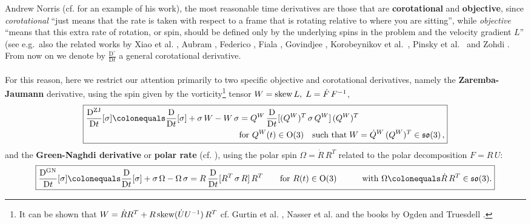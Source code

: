 \documentclass[10pt]{article}
\numberwithin{theoremCounter}{section}
\theoremstyle{plain}
\theoremstyle{definition}
\newcommand{\OO}{{\rm O}}
\newcommand{\DD}{\mathrm{D}}
\DeclareMathOperator{\ZJ}{ZJ}
\DeclareMathOperator{\GN}{GN}
\def\sk{\textnormal{skew}}
\numberwithin{equation}{section}
\begin{document}
Andrew Norris (cf. \cite{Norris2008} for an example of his work), the most reasonable time derivatives are those that are \textbf{corotational} and \textbf{objective}, since \textsl{corotational} \enquote{just means that the rate is taken with respect to a frame that is rotating relative to where you are sitting}, while \textsl{objective} \enquote{means that this extra rate of rotation, or spin, should be defined only by the underlying spins in the problem and the velocity gradient $L$} (see e.g.~also the related works by Xiao et al. \cite{xiao97, xiao98_2}, Aubram \cite{Aubram2017}, Federico \cite{bellini2015, palizi2020consistent}, Fiala \cite{fiala2009, fiala2016, fiala2020objective}, Govindjee \cite{govindjee1997}, Korobeynikov et al.~\cite{korobeynikov2018, korobeynikov2023, korobeynikov2023book, korobeynikov2024}, Pinsky et al.~\cite{pinsky1983} and Zohdi \cite{zohdi2006}. From now on we denote by $\frac{\DD^{\circ}}{\DD t}$ a general corotational derivative. \\
\\
For this reason, here we restrict our attention primarily to two specific objective and corotational derivatives, namely the \textbf{Zaremba-Jaumann} derivative, using the spin given by the vorticity\footnote
{
It can be shown that $W = \dot{R}R^T + R \, \sk(\dot{U}U^{-1}) \, R^T$ cf. Gurtin et al. \cite{Gurtin2010}, Nasser et al. \cite{mehrabadi1987} and the books by Ogden \cite[p.126]{Ogden83} and Truesdell \cite[p.21]{truesdell1966}.
}
tensor $W = \sk \, L, \; L = \dot F \, F^{-1}$,
	\begin{equation}
	\label{ZJrate01}
	\boxed{
		\begin{aligned}
		\frac{\DD^{\ZJ}}{\DD t}[\sigma] \colonequals \frac{\DD}{\DD t}[\sigma] + \sigma \, W - W \, \sigma &= Q^W \, \frac{\DD}{\DD t}[(Q^W)^T \, \sigma \, Q^W] \, (Q^W)^T  \\
		&\textnormal{for} \ Q^W(t) \in \OO(3)\quad \textnormal{such that} \;  W =\dot{Q}^W \, (Q^W)^T\in \mathfrak{so}(3)\,,
		\end{aligned}
	}
	\end{equation}
and the \textbf{Green-Naghdi derivative} or \textbf{polar rate} (cf. \cite{bellini2015, naghdi1961}), using the polar spin $\Omega = \dot R \, R^T$ related to the polar decomposition $F = R \, U$:
	\begin{align}
	\label{GNrate01}
	\boxed{\frac{\DD^{\GN}}{\DD t}[\sigma] \colonequals \frac{\DD}{\DD t}[\sigma] + \sigma \, \Omega - \Omega \, \sigma = R \, \frac{\DD}{\DD t}[R^T \, \sigma \, R] \, R^T \qquad \textnormal{for}\  R(t) \in \OO(3)\quad\qquad \textnormal{with} \ \Omega\colonequals \dot{R} \, R^T \in \mathfrak{so}(3).}
	\end{align}
\end{document}
